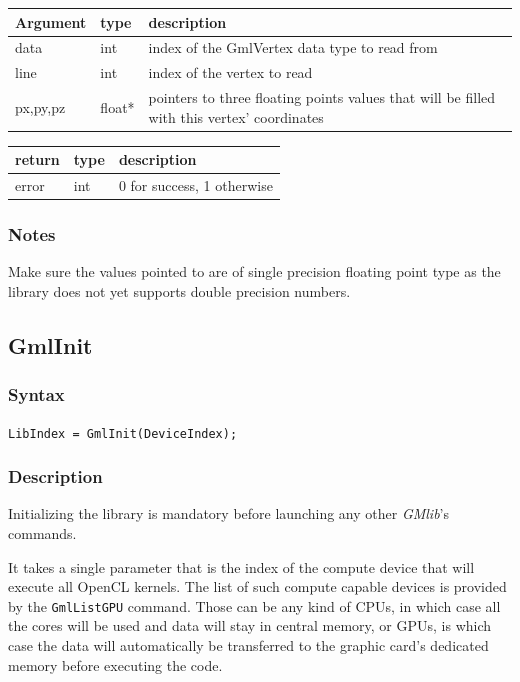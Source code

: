 \documentclass[a4paper,12pt]{article}
\begin{document}
\begin{tabular}{|m{2cm}|m{1.5cm}|m{10.5cm}|}
\hline
Argument   & type   & description \\
\hline
data       & int    & index of the GmlVertex data type to read from \\
\hline
line       & int    & index of the vertex to read \\
\hline
px,py,pz   & float* & pointers to three floating points values that will be filled with this vertex' coordinates \\
\hline
\end{tabular}

\medskip

\begin{tabular}{|m{2cm}|m{1.5cm}|m{10.5cm}|}
\hline
return     & type   & description \\
\hline
error     & int    & 0 for success, 1 otherwise \\
\hline
\end{tabular}
\subsubsection*{Notes}
Make sure the values pointed to are of single precision floating point type as the library does not yet supports double precision numbers.


\subsection{GmlInit}
\subsubsection*{Syntax}
{\tt LibIndex = GmlInit(DeviceIndex);}

\subsubsection*{Description}

Initializing the library is mandatory before launching any other \emph{GMlib}'s commands.

It takes a single parameter that is the index of the compute device that will execute all OpenCL kernels. The list of such compute capable devices is provided by the {\tt GmlListGPU} command. Those can be any kind of CPUs, in which case all the cores will be used and data will stay in central memory, or GPUs, is which case the data will automatically be transferred to the graphic card's dedicated memory before executing the code.
\end{document}
